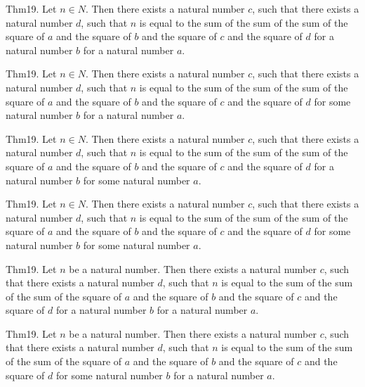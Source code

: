 \documentclass{article}
\begin{document}
Thm19. Let $n \in N$. Then there exists a natural number $c$, such that there exists a natural number $d$, such that $n$ is equal to the sum of the sum of the sum of the square of $a$ and the square of $b$ and the square of $c$ and the square of $d$ for a natural number $b$ for a natural number $a$.

Thm19. Let $n \in N$. Then there exists a natural number $c$, such that there exists a natural number $d$, such that $n$ is equal to the sum of the sum of the sum of the square of $a$ and the square of $b$ and the square of $c$ and the square of $d$ for some natural number $b$ for a natural number $a$.

Thm19. Let $n \in N$. Then there exists a natural number $c$, such that there exists a natural number $d$, such that $n$ is equal to the sum of the sum of the sum of the square of $a$ and the square of $b$ and the square of $c$ and the square of $d$ for a natural number $b$ for some natural number $a$.

Thm19. Let $n \in N$. Then there exists a natural number $c$, such that there exists a natural number $d$, such that $n$ is equal to the sum of the sum of the sum of the square of $a$ and the square of $b$ and the square of $c$ and the square of $d$ for some natural number $b$ for some natural number $a$.

Thm19. Let $n$ be a natural number. Then there exists a natural number $c$, such that there exists a natural number $d$, such that $n$ is equal to the sum of the sum of the sum of the square of $a$ and the square of $b$ and the square of $c$ and the square of $d$ for a natural number $b$ for a natural number $a$.

Thm19. Let $n$ be a natural number. Then there exists a natural number $c$, such that there exists a natural number $d$, such that $n$ is equal to the sum of the sum of the sum of the square of $a$ and the square of $b$ and the square of $c$ and the square of $d$ for some natural number $b$ for a natural number $a$.
\end{document}
